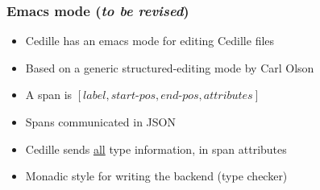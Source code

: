 \documentclass[11pt]{beamer}
\begin{document}
\begin{frame}
\frametitle{Emacs mode (\emph{to be revised})}

\begin{itemize}
\item Cedille has an emacs mode for editing Cedille files
\item Based on a generic structured-editing mode by Carl Olson

\vspace{.25cm}

\hspace{1cm}

\vspace{.1cm}

\item A span is $[\textit{label},\textit{start-pos},\textit{end-pos},\textit{attributes}]$

\item Spans communicated in JSON

\item Cedille sends \underline{all} type information, in span attributes

\item Monadic style for writing the backend (type checker)

\end{itemize}
\end{frame}
\end{document}

